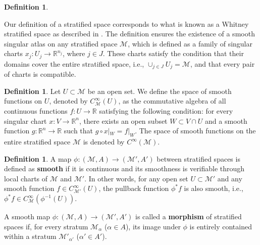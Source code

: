 \documentclass[12pt]{amsart}
\theoremstyle{definition}
\newtheorem{definition}[theorem]{Definition}
\numberwithin{equation}{section}
\newcommand{\Cinf}{C^\infty}
\begin{document}
{\begin{definition}
\end{definition}

Our definition of a stratified space corresponds to what is known as a Whitney stratified space as described in \cite{Pflaumpaper, Pflaumbook}. The definition ensures the existence of a smooth singular atlas on any stratified space $\mathcal{M}$, which is defined as a family of singular charts $x_j:U_j\to \mathbb{R}^{n_j}$, where $j\in J$. These charts satisfy the condition that their domains cover the entire stratified space, i.e., $\cup_{j\in J}U_j=\mathcal{M}$, and that every pair of charts is compatible.
\begin{definition}
	Let $U\subset \mathcal{M}$ be an open set. We define the space of smooth functions on $U$, denoted by $\Cinf_\mathcal{M}(U)$, as the commutative algebra of all continuous functions $f: U\to \mathbb{R}$ satisfying the following condition: for every singular chart $x: V\to \mathbb{R}^n$, there exists an open subset $W\subset V\cap U $ and a smooth function $g: \mathbb{R}^n\to \mathbb{R}$ such that   $g\circ x|_W=f|_W$. The space of smooth functions on the entire stratified space $\mathcal{M}$ is denoted by $\Cinf{(\mathcal{M})}$.
	
	
\end{definition}

\begin{definition}\label{Def:smoothmapstratified}
A     map $\phi: (\mathcal{M}, A) \to (\mathcal{M}', A')$ between stratified spaces is defined as \textbf{smooth} if it is  continuous and its smoothness is verifiable through local charts of $\mathcal{M}$ and $\mathcal{M}'$. In other words, for any open set $U \subset \mathcal{M}'$ and any smooth function $f \in \Cinf_{\mathcal{M}'}(U)$, the pullback function $\phi^*f$ is also smooth, i.e., $\phi^*f \in \Cinf_{\mathcal{M}}(\phi^{-1}(U))$.
	
 A   smooth map   $\phi:  (\mathcal{M},{A})\to (\mathcal{M}',A')$  is called   a \textbf{morphism} of stratified spaces if, for every stratum $\mathcal{M}_{\alpha}$ ($\alpha \in A$), its image under $\phi$ is entirely contained within a stratum $\mathcal{M}'_{\alpha'}$ ($\alpha' \in A'$).
\end{definition}



}
\end{document}
